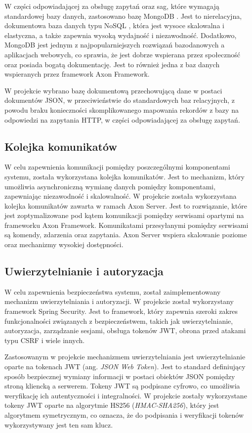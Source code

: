 W części odpowiadającej za obsługę zapytań oraz sag, które wymagają standardowej bazy danych, zastosowano bazę MongoDB \cite{mongodb}. Jest to nierelacyjna, dokumentowa baza danych typu NoSQL \cite{nosql},  która jest wysoce skalowalna i elastyczna, a także zapewnia wysoką wydajność i niezawodność. Dodatkowo, MongoDB jest jednym z najpopularniejszych rozwiązań bazodanowych a aplikacjach webowych, co sprawia, że jest dobrze wspierana przez społeczność oraz posiada bogatą dokumentację. Jest to również jedna z baz danych wspieranych przez framework Axon Framework.

W projekcie wybrano bazę dokumentową przechowującą dane w postaci dokumentów JSON, w przeciwieństwie do standardowych baz relacyjnych, z powodu braku konieczności skomplikowanego mapowania rekordów z bazy na odpowiedzi na zapytania HTTP, w części odpowiadającej za obsługę zapytań.

\subsection{Kolejka komunikatów}

W celu zapewnienia komunikacji pomiędzy poszczególnymi komponentami systemu, została wykorzystana kolejka komunikatów. Jest to mechanizm, który umożliwia asynchroniczną wymianę danych pomiędzy komponentami, zapewniając niezawodność i skalowalność. W projekcie została wykorzystana kolejka komunikatów zawarta w ramach Axon Server. Jest to rozwiązanie, które jest zoptymalizowane pod kątem komunikacji pomiędzy serwisami opartymi na frameworku Axon Framework. Komunikatami przesyłanymi pomiędzy serwisami są komendy, zdarzenia oraz zapytania. Axon Server wspiera skalowanie poziome oraz mechanizmy wysokiej dostępności.

\subsection{Uwierzytelnianie i autoryzacja}

W celu zapewnienia bezpieczeństwa systemu, został zaimplementowany mechanizm uwierzytelniania i autoryzacji. W projekcie został wykorzystany framework Spring Security. Jest to framework, który zapewnia szeroki zakres funkcjonalności związanych z bezpieczeństwem, takich jak uwierzytelnianie, autoryzacja, zarządzanie sesjami, obsługa tokenów JWT, obrona przed atakami typu CSRF i wiele innych.

Zastosowanym w projekcie mechanizmem uwierzytelniania jest uwierzytelnianie oparte na tokenach JWT (ang. \textit{JSON Web Token}). Jest to standard definiujący sposób bezpiecznej wymiany informacji w postaci obiektów JSON pomiędzy stroną kliencką a serwerem. Tokeny JWT są podpisane cyfrowo, co umożliwia weryfikację ich autentyczności i integralności. W projekcie zostały wykorzystane tokeny JWT oparte na algorytmie HS256 (\textit{HMAC-SHA256}), który jest algorytmem symetrycznym, co oznacza, że do podpisania i weryfikacji tokenów wykorzystywany jest ten sam klucz. 

